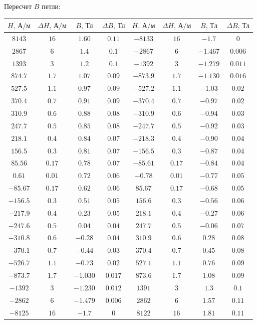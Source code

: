 \documentclass[a4paper]{article}
\begin{document}
\begin{enumerate}
\newpage
Пересчет $B$ петли:
\begin{center}
\begin{tabular}{|c|c|c|c|c|c|c|c|}\hline
$H\text{, А/м}$&$\Delta H\text{, А/м}$&$B\text{, Тл}$&$\Delta B\text{, Тл}$&$H\text{, А/м}$&$\Delta H\text{, А/м}$&$B\text{, Тл}$&$\Delta B\text{, Тл}$\\\hline
$8143$&$16$&$1.60$&$0.11$&$-8133$&$16$&$-1.7$&$0$\\\hline
$2867$&$6$&$1.4$&$0.1$&$-2867$&$6$&$-1.467$&$0.006$\\\hline
$1393$&$3$&$1.2$&$0.1$&$-1392$&$3$&$-1.279$&$0.011$\\\hline
$874.7$&$1.7$&$1.07$&$0.09$&$-873.9$&$1.7$&$-1.130$&$0.016$\\\hline
$527.5$&$1.1$&$0.97$&$0.09$&$-527.2$&$1.1$&$-1.03$&$0.02$\\\hline
$370.4$&$0.7$&$0.91$&$0.09$&$-370.4$&$0.7$&$-0.97$&$0.02$\\\hline
$310.9$&$0.6$&$0.88$&$0.08$&$-310.9$&$0.6$&$-0.94$&$0.03$\\\hline
$247.7$&$0.5$&$0.85$&$0.08$&$-247.7$&$0.5$&$-0.92$&$0.03$\\\hline
$218.1$&$0.4$&$0.84$&$0.07$&$-218.3$&$0.4$&$-0.90$&$0.04$\\\hline
$156.5$&$0.3$&$0.81$&$0.07$&$-156.5$&$0.3$&$-0.87$&$0.04$\\\hline
$85.56$&$0.17$&$0.78$&$0.07$&$-85.61$&$0.17$&$-0.84$&$0.04$\\\hline
$0.61$&$0.01$&$0.72$&$0.06$&$-0.78$&$0.01$&$-0.77$&$0.05$\\\hline
$-85.67$&$0.17$&$0.62$&$0.06$&$85.67$&$0.17$&$-0.68$&$0.05$\\\hline
$-156.5$&$0.3$&$0.51$&$0.05$&$156.6$&$0.3$&$-0.56$&$0.06$\\\hline
$-217.9$&$0.4$&$0.23$&$0.05$&$218.1$&$0.4$&$-0.27$&$0.06$\\\hline
$-247.6$&$0.5$&$0.04$&$0.04$&$247.7$&$0.5$&$-0.06$&$0.07$\\\hline
$-310.8$&$0.6$&$-0.28$&$0.04$&$310.9$&$0.6$&$0.28$&$0.08$\\\hline
$-370.1$&$0.7$&$-0.44$&$0.03$&$370.4$&$0.7$&$0.45$&$0.08$\\\hline
$-526.7$&$1.1$&$-0.73$&$0.02$&$527.1$&$1.1$&$0.76$&$0.09$\\\hline
$-873.7$&$1.7$&$-1.030$&$0.017$&$873.6$&$1.7$&$1.08$&$0.09$\\\hline
$-1392$&$3$&$-1.230$&$0.012$&$1391$&$3$&$1.3$&$0.1$\\\hline
$-2862$&$6$&$-1.479$&$0.006$&$2862$&$6$&$1.57$&$0.11$\\\hline
$-8125$&$16$&$-1.7$&$0$&$8122$&$16$&$1.81$&$0.11$\\\hline
\end{tabular}\\~\\
\end{center}



\end{enumerate}
\end{document}

